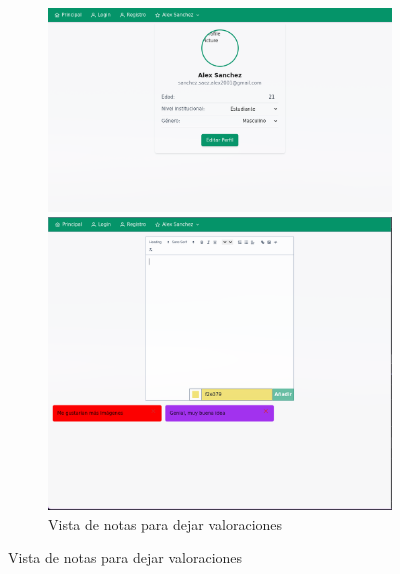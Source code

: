 \begin{anexos}
\begin{figure}
	\begin{figure}[H]
		\centering
		\begin{minipage}[b]{0.48\linewidth}  %
			\centering
			\includegraphics[width=\linewidth]{Graphics/capturas/profile.png}
			\caption{Perfil del usuario para recaudar informaci\'on }
			\label{user-profile} 
		\end{minipage}%
		\hfill
		\begin{minipage}[b]{0.48\linewidth} %
			\centering
			\includegraphics[width=\linewidth]{Graphics/capturas/notes.png}
			\caption{Vista de notas para dejar valoraciones } 
			\label{notes}          
		\end{minipage}
	\end{figure}
	

\end{figure}
\end{anexos}
